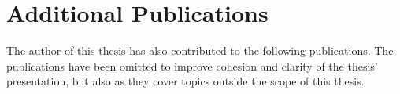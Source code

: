 \section{Additional Publications}%
\label{sec:additional-publications}%
%
The author of this thesis has also contributed to the following publications.
The publications have been omitted to improve cohesion and clarity of the thesis' presentation, but also as they cover topics outside the scope of this thesis.

\begin{quote}
\end{quote}

\begin{quote}
\end{quote}

\begin{quote}
\end{quote}

\begin{quote}
\end{quote}

\begin{quote}
\end{quote}
